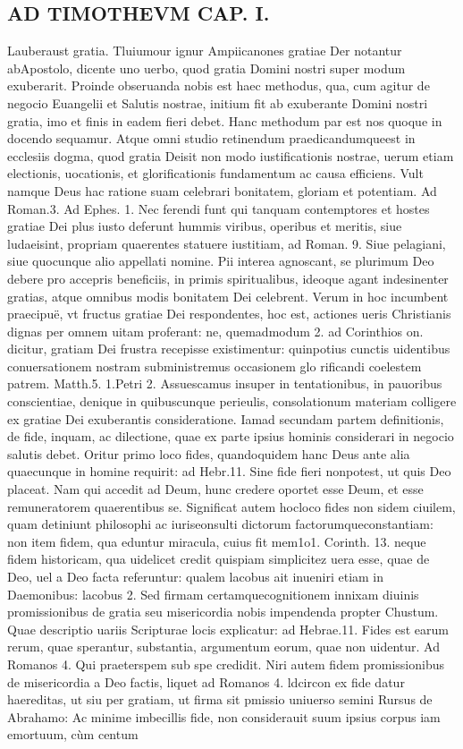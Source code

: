 \documentclass{article}
\begin{document}
\begin{pages}
\section*{AD TIMOTHEVM CAP. I. }
\marginpar{[ p.46 ]}\pstart Lauberaust gratia. Tluiumour ignur Ampiicanones gratiae Der notantur abApostolo, dicente uno uerbo, quod gratia Domini nostri super modum exuberarit.  \pend\pstart Proinde obseruanda nobis est haec methodus, qua, cum agitur de negocio Euangelii et Salutis nostrae, initium fit ab exuberante Domini nostri gratia, imo et finis in eadem fieri debet. Hanc methodum par est nos quoque in docendo sequamur. Atque omni studio retinendum praedicandumqueest in ecclesiis dogma, quod gratia Deisit non modo iustificationis nostrae, uerum etiam electionis, uocationis, et glorificationis fundamentum ac causa efficiens. Vult namque  Deus hac ratione suam celebrari bonitatem, gloriam et potentiam. Ad Roman.3. Ad Ephes. 1. Nec ferendi funt qui tanquam contemptores et hostes gratiae Dei plus iusto deferunt hummis viribus, operibus et meritis, siue ludaeisint, propriam quaerentes statuere iustitiam, ad Roman. 9. Siue pelagiani, siue quocunque alio appellati nomine. Pii interea agnoscant, se plurimum Deo debere pro accepris beneficiis, in primis spiritualibus, ideoque  agant indesinenter gratias, atque omnibus modis bonitatem Dei celebrent. Verum in hoc incumbent praecipuë, vt fructus gratiae Dei respondentes, hoc est, actiones ueris Christianis dignas per omnem uitam proferant: ne, quemadmodum 2. ad Corinthios on. dicitur, gratiam Dei frustra recepisse existimentur: quinpotius cunctis uidentibus conuersationem nostram subministremus occasionem glo rificandi coelestem patrem. Matth.5. 1.Petri 2. Assuescamus insuper in tentationibus, in pauoribus conscientiae, denique in quibuscunque  perieulis, consolationum materiam colligere ex gratiae Dei exuberantis consideratione.  \pend\pstart Iamad secundam partem definitionis, de fide, inquam, ac dilectione, quae ex parte ipsius hominis considerari in negocio salutis debet. Oritur primo loco fides, quandoquidem hanc Deus ante alia quaecunque in homine requirit: ad Hebr.11. Sine fide fieri nonpotest, ut quis Deo placeat. Nam qui accedit ad Deum, hunc credere oportet esse Deum, et esse remuneratorem quaerentibus se. Significat autem hocloco fides non sidem ciuilem, quam detiniunt philosophi ac iuriseonsulti dictorum factorumqueconstantiam: non item fidem, qua eduntur miracula, cuius fit mem1o1. Corinth. 13. neque fidem historicam, qua uidelicet credit quispiam simplicitez uera esse, quae de Deo, uel a Deo facta referuntur: qualem lacobus ait inueniri etiam in Daemonibus: lacobus 2. Sed firmam certamquecognitionem innixam diuinis promissionibus de gratia seu misericordia nobis impendenda propter Chustum. Quae descriptio uariis Scripturae locis explicatur: ad Hebrae.11. Fides est earum rerum, quae sperantur, substantia, argumentum eorum, quae non uidentur. Ad Romanos 4. Qui praeterspem sub spe credidit. Niri autem fidem promissionibus de misericordia a Deo factis, liquet ad Romanos 4. ldcircon ex fide datur haereditas, ut siu per gratiam, ut firma sit pmissio uniuerso semini Rursus de Abrahamo: Ac minime imbecillis fide, non considerauit suum ipsius corpus iam emortuum, cùm centum 
\end{pages}
\end{document}
